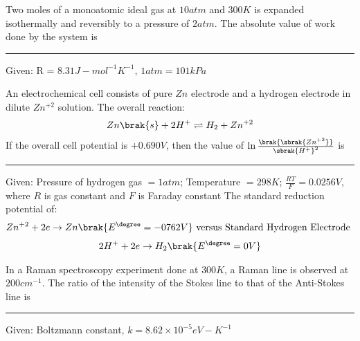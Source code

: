 		\hfill{}

	\item Two moles of a monoatomic ideal gas at $10 atm$ and $300 K$ is expanded isothermally and reversibly to a pressure of $2 atm$. The absolute value of work done by the system is  \rule{1cm}{0.1pt} 

		Given: R = $8.31J-mol^{-1}K^{-1}$, $1 atm = 101 kPa$

		\hfill{}

	\item An electrochemical cell consists of pure $Zn$ electrode  and a hydrogen electrode  in dilute $Zn^{+2}$ solution. The overall reaction: 
		\begin{align*}
			Zn\brak{s} + 2H^{+} \rightleftharpoons H_2 + Zn^{+2}
		\end{align*}
		If the overall cell potential is $+0.690 V$, then the value of $\ln{\frac{\brak{\sbrak{Zn^{+2}}}}{\sbrak{H^{+}}^2}}$ is \rule{1cm}{0.1pt} 
		Given: Pressure of hydrogen gas $= 1 atm$; Temperature $= 298K$;
		$\frac{RT}{F} = 0.0256 V$, where $R$ is gas constant and $F$ is Faraday constant
		The standard reduction potential of: 
		\begin{align*}
			Zn^{+2} + 2e \rightarrow Zn \brak{E^{\degree} = -0762 V} \text{ versus Standard Hydrogen Electrode }
		\end{align*}
		\begin{align*}
			2H^{+} + 2e \rightarrow H_2 \brak{E^{\degree} = 0 V}
		\end{align*}

		\hfill{}

	\item In a Raman spectroscopy experiment done at $300K$, a Raman line is observed at $200cm^{-1}$. The ratio of the intensity of the Stokes line to that of the Anti-Stokes line is \rule{1cm}{0.1pt} 

		Given: Boltzmann constant, $k = 8.62 \times 10^{-5} eV-K^{-1}$
		\hfill{}

